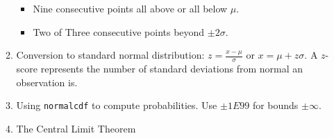 \documentclass{article}
\begin{document}
\begin{enumerate}
\begin{enumerate}
\begin{itemize}
                \item Nine consecutive points all above or all below $\mu$.
                
                \item Two of Three consecutive points beyond $\pm 2\sigma$.
                
            \end{itemize}
            
        \item Conversion to standard normal distribution: $z=\frac{x-\mu}{\sigma}$ or $x=\mu + z\sigma$. A $z$-score represents the number of standard deviations from normal an observation is.
        
        \item Using \texttt{normalcdf} to compute probabilities. Use $\pm 1 E 99$ for bounds $\pm\infty$.
        
        \item The Central Limit Theorem
        
        \end{enumerate}
        
\end{enumerate}
\end{document}
